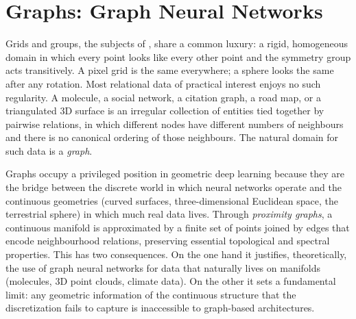 \providecommand{\N}{\mathbb{N}}
\providecommand{\tr}{\operatorname{tr}}
\providecommand{\Lap}{\mathcal{L}}
\providecommand{\Nbr}{\mathcal{N}}
\providecommand{\HASH}{\operatorname{HASH}}
\providecommand{\WL}{\textsc{wl}}
\providecommand{\Hess}{\operatorname{Hess}}
\providecommand{\dive}{\operatorname{div}}
\providecommand{\grad}{\operatorname{grad}}
\providecommand{\im}{\operatorname{im}}
\providecommand{\rank}{\operatorname{rank}}

\chapter{Graphs: Graph Neural Networks}
\label{ch:graphs}

Grids and groups, the subjects of , share a common
luxury: a rigid, homogeneous domain in which every point looks like every other
point and the symmetry group acts transitively. A pixel grid is the same
everywhere; a sphere looks the same after any rotation. Most relational data of
practical interest enjoys no such regularity. A molecule, a social network, a
citation graph, a road map, or a triangulated 3D surface is an irregular
collection of entities tied together by pairwise relations, in which different
nodes have different numbers of neighbours and there is no canonical ordering of
those neighbours. The natural domain for such data is a \emph{graph}.

Graphs occupy a privileged position in geometric deep learning because they are
the bridge between the discrete world in which neural networks operate and the
continuous geometries (curved surfaces, three-dimensional Euclidean space, the
terrestrial sphere) in which much real data lives. Through \emph{proximity
graphs}, a continuous manifold is approximated by a finite set of points joined
by edges that encode neighbourhood relations, preserving essential topological
and spectral properties. This has two consequences. On the one hand it justifies,
theoretically, the use of graph neural networks for data that naturally lives on
manifolds (molecules, 3D point clouds, climate data). On the other it sets a
fundamental limit: any geometric information of the continuous structure that the
discretization fails to capture is inaccessible to graph-based architectures.

